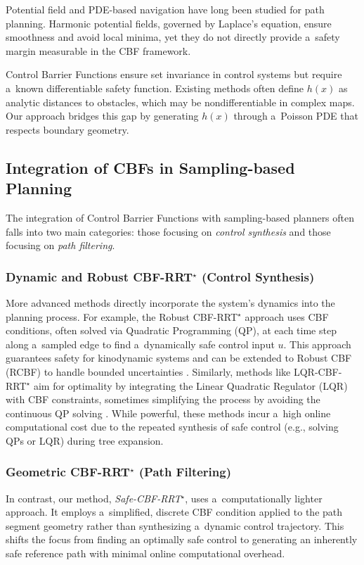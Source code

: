 \documentclass[letterpaper, 10 pt, conference]{ieeeconf}
\begin{document}
Potential field and PDE-based navigation \cite{s22093295} have long
been studied for path planning. Harmonic potential fields, governed by Laplace's
equation, ensure smoothness and avoid local minima, yet they do not directly
provide a~safety margin measurable in the CBF framework.

Control Barrier Functions \cite{8796030,garg2023advancestheorycontrolbarrier} ensure set
invariance in control systems but require a~known differentiable safety
function. Existing methods often define $h(x)$ as analytic distances to
obstacles, which may be nondifferentiable in complex maps. Our approach
bridges this gap by generating $h(x)$ through a~Poisson PDE that respects
boundary geometry.

\subsection{Integration of CBFs in Sampling-based Planning}
The integration of Control Barrier Functions with sampling-based planners often
falls into two main categories: those focusing on \textit{control synthesis} and those
focusing on \textit{path filtering}.

\subsubsection{Dynamic and Robust CBF-RRT$^\star$ (Control Synthesis)}
    More advanced methods
    directly incorporate the system's dynamics into the planning process. For example,
    the Robust CBF-RRT$^\star$ approach \cite{Yang_2019} uses CBF conditions, often solved
    via Quadratic Programming (QP), at each time step along a~sampled edge to
    find a~dynamically safe control input $u$. This approach guarantees safety
    for kinodynamic systems and can be extended to Robust CBF (RCBF) to
    handle bounded uncertainties \cite{Yang_2019}. Similarly, methods like
    LQR-CBF-RRT$^\star$ aim for optimality by integrating the Linear Quadratic
    Regulator (LQR) with CBF constraints, sometimes simplifying the process by
    avoiding the continuous QP solving \cite{yang2023lqrcbfrrtsafeoptimalmotion}. While powerful,
    these methods incur a~high online computational cost due to the repeated
    synthesis of safe control (e.g., solving QPs or LQR) during tree expansion.

\subsubsection{Geometric CBF-RRT$^\star$ (Path Filtering)}
    In contrast,
    our method, \emph{Safe-CBF-RRT$^\star$}, uses a~computationally lighter
    approach. It employs a~simplified, discrete CBF condition applied to the
    path segment geometry rather than synthesizing a~dynamic control trajectory.
    This shifts the focus from finding an optimally safe control to generating an
    inherently safe reference path with minimal online computational overhead.
\end{document}
